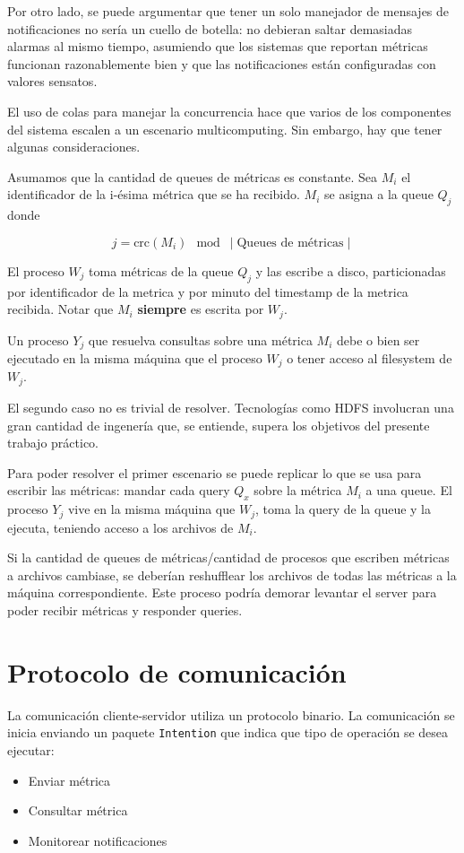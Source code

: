 \documentclass[a4paper,oneside]{article}
\begin{document}
Por otro lado, se puede argumentar que tener un solo manejador de mensajes de notificaciones no sería un cuello de botella: no debieran saltar demasiadas alarmas al mismo tiempo, asumiendo que los sistemas que reportan métricas funcionan razonablemente bien y que las notificaciones están configuradas con valores sensatos.

El uso de colas para manejar la concurrencia hace que varios de los componentes del sistema escalen a un escenario multicomputing. Sin embargo, hay que tener algunas consideraciones.

Asumamos que la cantidad de queues de métricas es constante. Sea $M_i$ el identificador de la i-ésima métrica que se ha recibido. $M_i$ se asigna a la queue $Q_j$ donde

\begin{equation}\label{crcindex}
	j = \text{crc}(M_i) \mod \mid \text{Queues de métricas} \mid
\end{equation}

El proceso $W_j$ toma métricas de la queue $Q_j$ y las escribe a disco, particionadas por identificador de la metrica y por minuto del timestamp de la metrica recibida. Notar que $M_i$ \textbf{siempre} es escrita por $W_j$.

Un proceso $Y_j$ que resuelva consultas sobre una métrica $M_i$ debe o bien ser ejecutado en la misma máquina que el proceso $W_j$ o tener acceso al filesystem de $W_j$.

El segundo caso no es trivial de resolver. Tecnologías como HDFS\cite{HDFS} involucran una gran cantidad de ingenería que, se entiende, supera los objetivos del presente trabajo práctico.

Para poder resolver el primer escenario se puede replicar lo que se usa para escribir las métricas: mandar cada query $Q_x$ sobre la métrica $M_i$ a una queue. El proceso $Y_j$ vive en la misma máquina que $W_j$, toma la query de la queue y la ejecuta, teniendo acceso a los archivos de $M_i$.

Si la cantidad de queues de métricas/cantidad de procesos que escriben métricas a archivos cambiase, se deberían reshufflear los archivos de todas las métricas a la máquina correspondiente. Este proceso podría demorar levantar el server para poder recibir métricas y responder queries.

\section{Protocolo de comunicación}
La comunicación cliente-servidor utiliza un protocolo binario. La comunicación se inicia enviando un paquete \texttt{Intention}\cite{IntentionPackage} que indica que tipo de operación se desea ejecutar:
\begin{itemize}
	\item Enviar métrica
	\item Consultar métrica
	\item Monitorear notificaciones
\end{itemize}
\end{document}
